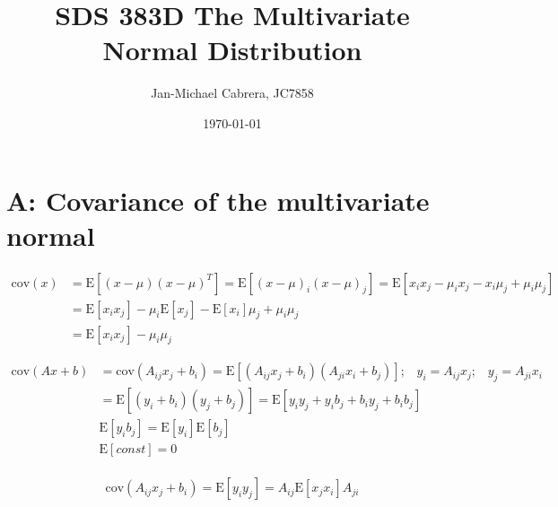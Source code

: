 \documentclass[12pt]{article}
\begin{document}
    \title{SDS 383D The Multivariate Normal Distribution}
    \author{Jan-Michael Cabrera, JC7858}
    \date{\today}
    \maketitle

    \section*{A: Covariance of the multivariate normal}

        \begin{align}
            \text{cov}(x) &= \text{E}[(x-\mu)(x-\mu)^T ] = \text{E}[(x-\mu)_i (x-\mu)_j] = \text{E}[ x_i x_j - \mu_i x_j - x_i \mu_j + \mu_i \mu_j] \\
                &= \text{E}[x_i x_j] - \mu_i \text{E}[x_j] - \text{E}[x_i] \mu_j + \mu_i \mu_j \\
                &= \text{E}[x_i x_j] - \mu_i \mu_j
        \end{align}

        \begin{align}
            \text{cov}(Ax+b) &= \text{cov}(A_{ij}x_j + b_i) = \text{E}[(A_{ij}x_j + b_i)(A_{ji}x_i + b_j)]; \hspace{10pt} y_i = A_{ij}x_j; \hspace{10pt} y_j = A_{ji} x_i \\
            &= \text{E}[(y_i + b_i)(y_j + b_j)] = \text{E}[y_i y_j + y_i b_j + b_i y_j + b_i b_j] \\
            &\text{E}[y_i b_j] = \text{E}[y_i] \text{E}[b_j] \\
            &\text{E}[const] = 0 \\
        \end{align}

        \begin{equation}
            \text{cov}(A_{ij}x_j + b_i) = \text{E}[y_i y_j] = A_{ij} \text{E}[x_j x_i] A_{ji}
        \end{equation}
\end{document}
